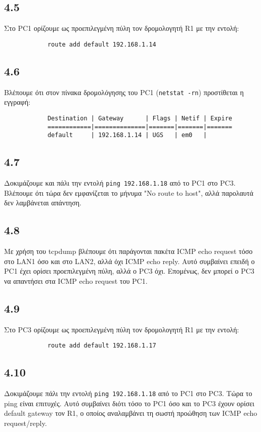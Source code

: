 \documentclass[a4paper, 12pt]{article}
\begin{document}
	\subsection*{4.5}
		Στο PC1 ορίζουμε ως προεπιλεγμένη πύλη τον δρομολογητή R1 με την εντολή:
		
		\begin{verbatim}
			route add default 192.168.1.14
		\end{verbatim}

	\subsection*{4.6}
		Βλέπουμε ότι στον πίνακα δρομολόγησης του PC1 (\verb|netstat -rn|) προστίθεται η εγγραφή:
		
		\begin{verbatim}
			Destination | Gateway      | Flags | Netif | Expire
			============|==============|=======|=======|=======
			default     | 192.168.1.14 | UGS   | em0   |
		\end{verbatim} 

	\subsection*{4.7}
		Δοκιμάζουμε και πάλι την εντολή \verb|ping 192.168.1.18| από το PC1 στο PC3. Βλέπουμε ότι τώρα δεν εμφανίζεται το μήνυμα "No route to host", αλλά παρολαυτά δεν λαμβάνεται απάντηση.

	\subsection*{4.8}
		Με χρήση του tcpdump βλέπουμε ότι παράγονται πακέτα ICMP echo request τόσο στο LAN1 όσο και στο LAN2, αλλά όχι ICMP echo reply. Αυτό συμβαίνει επειδή ο PC1 έχει ορίσει προεπιλεγμένη πύλη, αλλά ο PC3 όχι. Επομένως, δεν μπορεί ο PC3 να απαντήσει στα ICMP echo request του PC1.

	\subsection*{4.9}
		Στο PC3 ορίζουμε ως προεπιλεγμένη πύλη τον δρομολογητή R1 με την εντολή:
		
		\begin{verbatim}
			route add default 192.168.1.17
		\end{verbatim}

	\subsection*{4.10}
		Δοκιμάζουμε πάλι την εντολή \verb|ping 192.168.1.18| από το PC1 στο PC3. Τώρα το ping είναι επιτυχές. Αυτό συμβαίνει διότι τόσο το PC1 όσο και το PC3 έχουν ορίσει default gateway τον R1, ο οποίος αναλαμβάνει τη σωστή προώθηση των ICMP echo request/reply.
\end{document}
